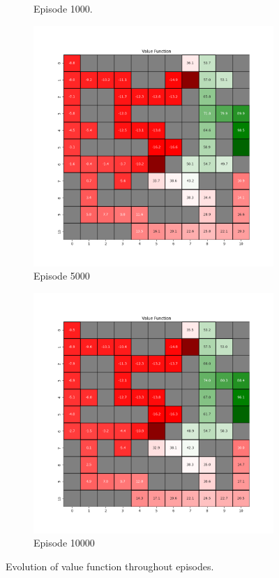 \documentclass{assignment}
\begin{document}
\begin{figure}[H]
\begin{subfigure}{0.3\textwidth}
    \caption{Episode 1000.}
    \end{subfigure}\hfill
    \begin{subfigure}{0.3\textwidth}
        \includegraphics[width=\textwidth]{figures/value_q/epsilon_sweep/value_function_alpha_0.1_gamma_0.95_epsilon_0.8_iteration_5000.png}
    \caption{Episode 5000}
    \end{subfigure}\hfill
    \begin{subfigure}{0.3\textwidth}
        \includegraphics[width=\textwidth]{figures/value_q/epsilon_sweep/value_function_alpha_0.1_gamma_0.95_epsilon_0.8_iteration_10000.png}
    \caption{Episode 10000}
    \end{subfigure}
    \caption{Evolution of value function throughout episodes.}
    \label{fig:epsilon_0.8_q_learning_value}
\end{figure}
\end{document}
